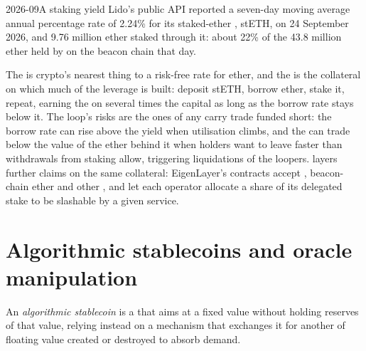 \begin{dated}{2026-09}{A staking yield}\label{dat:m3:defi-credit-and-leverage:lido}
Lido's public API reported a seven-day moving average annual percentage rate of 2.24\% for its staked-ether , stETH, on 24 September 2026,
and 9.76 million ether staked through it: about 22\% of the 43.8 million ether held by  on the beacon chain that day.
\end{dated}

The  is crypto's nearest thing to a risk-free rate for ether, and the  is the collateral on which much of the
leverage is built: deposit stETH, borrow ether, stake it, repeat, earning the  on several times the capital as long as the borrow rate
stays below it. The loop's risks are the ones of any carry trade funded short: the borrow rate can rise above the yield when utilisation climbs,
and the  can trade below the value of the ether behind it when holders want to leave faster than withdrawals from staking allow,
triggering liquidations of the loopers.  layers further claims on the same collateral: EigenLayer's contracts accept , beacon-chain ether and other , and let each operator allocate a share of its delegated stake to be slashable by a given service.

\section{Algorithmic stablecoins and oracle manipulation}

\begin{definition}\label{def:m3:defi-credit-and-leverage:algo}
An \emph{algorithmic stablecoin} is a  that aims at a fixed value without holding reserves of that value, relying
instead on a mechanism that exchanges it for another  of floating value created or destroyed to absorb demand.
\end{definition}

